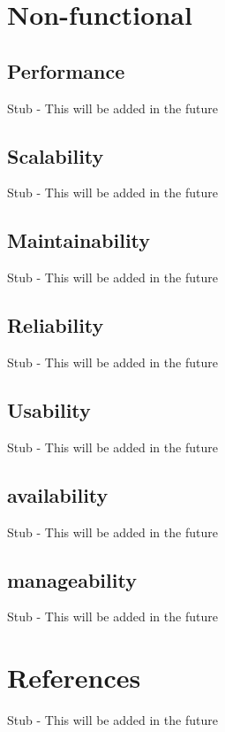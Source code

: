 \documentclass[12pt]{article}
\begin{document}
\section{Non-functional} %
\subsection{Performance}
Stub - This will be added in the future
\subsection{Scalability}
Stub - This will be added in the future
\subsection{Maintainability}
Stub - This will be added in the future
\subsection{Reliability}
Stub - This will be added in the future
\subsection{Usability}
Stub - This will be added in the future
\subsection{availability}
Stub - This will be added in the future
\subsection{manageability}
Stub - This will be added in the future

\section{References}
Stub - This will be added in the future
\end{document}

